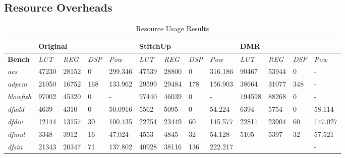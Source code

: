 \subsection{Resource Overheads}
\renewcommand{\arraystretch}{0.8}
\begin{table}[t]
\small
\singlespace
\centering
\caption{Resource Usage Results}
\label{tab:resources}
\tabcolsep=0.11cm
\begin{tabular}{@{}|l|l|l|l|l|l|l|l|l|l|l|l|l|@{}}
\toprule
                    & \multicolumn{4}{l|}{\textbf{Original}}                      & \multicolumn{4}{l|}{\textbf{StitchUp}}                      & \multicolumn{4}{l|}{\textbf{DMR}}                           \\ \midrule
\textbf{Bench}      & \textit{LUT} & \textit{REG} & \textit{DSP} & \textit{Pow}   & \textit{LUT} & \textit{REG} & \textit{DSP} & \textit{Pow}   & \textit{LUT} & \textit{REG} & \textit{DSP} & \textit{Pow}   \\ \midrule
\textit{aes}        & 47230        & 28152        & 0            & 299.346        & 47539        & 28800        & 0            & 316.186        & 90467        & 53944        & 0            & -              \\ \midrule
\textit{adpcm}      & 21050        & 16752        & 168          & 133.962        & 29599        & 29484        & 178          & 156.903        & 38664        & 31077        & 348          & -              \\ \midrule
\textit{blowfish}   & 97002        & 45320        & 0            & -              & 97440        & 46039        & 0            & -              & 194598       & 88268        & 0            & -              \\ \midrule
\textit{dfadd}      & 4639         & 4310         & 0            & 50.0916        & 5562         & 5095         & 0            & 54.224         & 6394         & 5754         & 0            & 58.114         \\ \midrule
\textit{dfdiv}      & 12144        & 13157        & 30           & 100.435        & 22254        & 23449        & 60           & 145.577        & 22811        & 23904        & 60           & 147.027        \\ \midrule
\textit{dfmul}      & 3348         & 3912         & 16           & 47.024         & 4553         & 4845         & 32           & 54.128         & 5105         & 5397         & 32           & 57.521         \\ \midrule
\textit{dfsin}      & 21343        & 20347        & 71           & 137.802        & 40928        & 38116        & 136          & 222.217        &              &              &              & -              \\ \midrule

\end{tabular}
\end{table}
